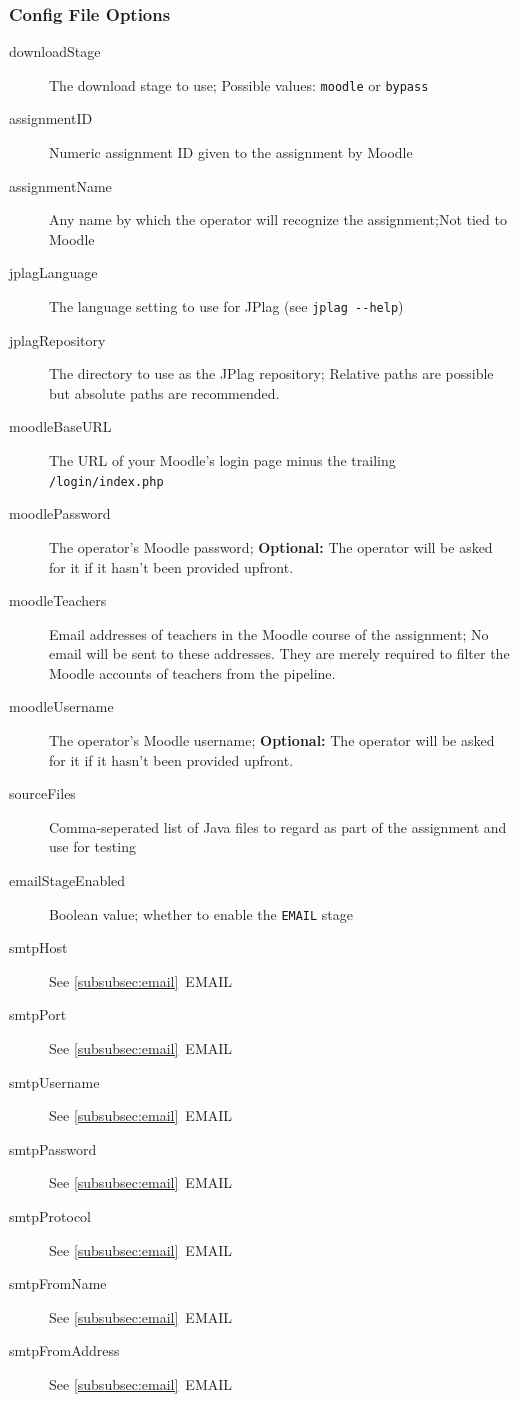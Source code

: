 \documentclass[12pt,a4paper,oneside]{report}
\begin{document}
	\subsubsection{Config File Options}

	\begin{description}
		\item[downloadStage] The download stage to use; Possible values: \lstinline|moodle| or \lstinline|bypass|
		\item[assignmentID] Numeric assignment ID given to the assignment by Moodle
		\item[assignmentName] Any name by which the operator will recognize the assignment;\linebreak{}Not tied to Moodle
		\item[jplagLanguage] The language setting to use for JPlag (see \lstinline|jplag --help|)
		\item[jplagRepository] The directory to use as the JPlag repository; Relative paths are possible but absolute paths are recommended.
		\item[moodleBaseURL] The URL of your Moodle's login page minus the trailing \lstinline|/login/index.php|
		\item[moodlePassword] The operator's Moodle password; \textbf{Optional:} The operator will be asked for it if it hasn't been provided upfront.
		\item[moodleTeachers] Email addresses of teachers in the Moodle course of the assignment; No email will be sent to these addresses. They are merely required to filter the Moodle accounts of teachers from the pipeline.
		\item[moodleUsername] The operator's Moodle username; \textbf{Optional:} The operator will be asked for it if it hasn't been provided upfront.
		\pagebreak
		\item[sourceFiles] Comma-seperated list of Java files to regard as part of the assignment and use for testing
		\item[emailStageEnabled] Boolean value; whether to enable the \lstinline|EMAIL| stage
		\item[smtpHost] See \ref{subsubsec:email}~EMAIL
		\item[smtpPort] See \ref{subsubsec:email}~EMAIL
		\item[smtpUsername] See \ref{subsubsec:email}~EMAIL
		\item[smtpPassword] See \ref{subsubsec:email}~EMAIL
		\item[smtpProtocol] See \ref{subsubsec:email}~EMAIL
		\item[smtpFromName] See \ref{subsubsec:email}~EMAIL
		\item[smtpFromAddress] See \ref{subsubsec:email}~EMAIL

	\end{description}
\end{document}
